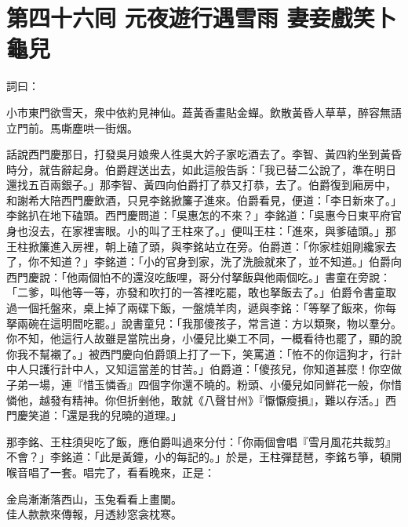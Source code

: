
\chapter*{第四十六囘 元夜遊行遇雪雨 妻妾戲笑卜龜兒}


詞曰：

\begin{myquote}
小市東門欲雪天，衆中依約見神仙。蕋黃香畫貼金蟬。飲散黃昏人草草，醉容無語立門前。馬嘶塵哄一街烟。

\end{myquote}

話說西門慶那日，打發吳月娘衆人徃吳大妗子家吃酒去了。李智、黃四約坐到黃昏時分，就告辭起身。伯爵趕送出去，如此這般告訴：「我已替二公說了，準在明日還找五百兩銀子。」那李智、黃四向伯爵打了恭又打恭，去了。伯爵復到廂房中，和謝希大陪西門慶飲酒，只見李銘掀簾子進來。伯爵看見，便道：「李日新來了。」李銘扒在地下磕頭。西門慶問道：「吳惠怎的不來？」李銘道：「吳惠今日東平府官身也沒去，在家裡害眼。小的叫了王柱來了。」便叫王柱：「進來，與爹磕頭。」那王柱掀簾進入房裡，朝上磕了頭，與李銘站立在旁。伯爵道：「你家桂姐剛纔家去了，你不知道？」李銘道：「小的官身到家，洗了洗臉就來了，並不知道。」伯爵向西門慶說：「他兩個怕不的還沒吃飯哩，哥分付拏飯與他兩個吃。」書童在旁說：「二爹，叫他等一等，亦發和吹打的一答裡吃罷，敢也拏飯去了。」伯爵令書童取過一個托盤來，桌上掉了兩碟下飯，一盤燒羊肉，遞與李銘：「等拏了飯來，你每拏兩碗在這明間吃罷。」說書童兒：「我那傻孩子，常言道：方以類聚，物以羣分。你不知，他這行人故雖是當院出身，小優兒比樂工不同，一概看待也罷了，顯的說你我不幫襯了。」被西門慶向伯爵頭上打了一下，笑罵道：「恠不的你這狗才，行計中人只護行計中人，又知這當差的甘苦。」伯爵道：「傻孩兒，你知道甚麼！你空做子弟一場，連『惜玉憐香』四個字你還不曉的。粉頭、小優兒如同鮮花一般，你惜憐他，越發有精神。你但折剉他，敢就《八聲甘州》『懨懨瘦損』，難以存活。」西門慶笑道：「還是我的兒曉的道理。」

那李銘、王柱須臾吃了飯，應伯爵叫過來分付：「你兩個會唱『雪月風花共裁剪』不會？」李銘道：「此是黃鐘，小的每記的。」於是，王柱彈琵琶，李銘ち箏，頓開喉音唱了一套。唱完了，看看晚來，正是：

\begin{myquote}
金烏漸漸落西山，玉兔看看上畫闌。\\佳人款款來傳報，月透紗窓衾枕寒。
\end{myquote}

